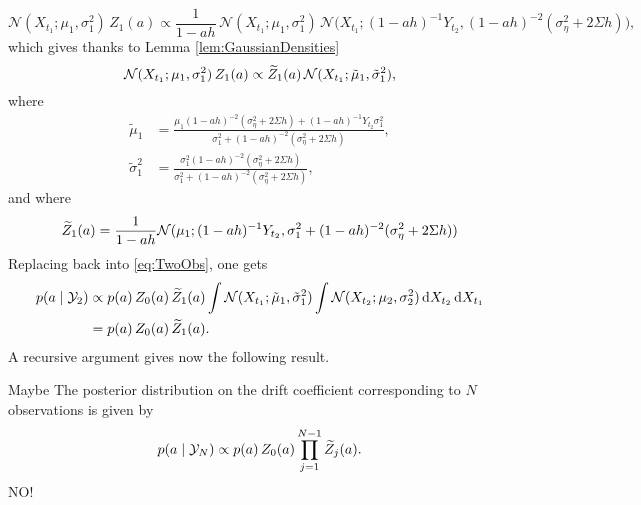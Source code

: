 \documentclass[10pt]{article}
\begin{document}
\begin{equation}
	\mathcal N(X_{t_1}; \mu_1, \sigma_1^2) \, Z_1(a) \propto \frac{1}{1 - ah} \, \mathcal N(X_{t_1}; \mu_1, \sigma_1^2) \, \mathcal N\big(X_{t_1}; (1-ah)^{-1} Y_{t_2}, (1-ah)^{-2} (\sigma_\eta^2 + 2\Sigma h)\big),
\end{equation}
which gives thanks to Lemma \ref{lem:GaussianDensities}
\begin{equation}
	\mathcal N(X_{t_1}; \mu_1, \sigma_1^2) \, Z_1(a) \propto \widetilde Z_1(a) \, \mathcal N (X_{t_1}; \tilde \mu_1, \tilde \sigma_1^2),
\end{equation}
where 
\begin{equation}
\begin{aligned}
	\tilde \mu_1 &= \frac{\mu_1 (1-ah)^{-2} (\sigma_\eta^2 + 2\Sigma h) + (1-ah)^{-1} Y_{t_2} \sigma_1^2}{\sigma_1^2 + (1-ah)^{-2} (\sigma_\eta^2 + 2\Sigma h)},\\
	\tilde \sigma_1^2 &= \frac{\sigma_1^2(1-ah)^{-2} (\sigma_\eta^2 + 2\Sigma h)}{\sigma_1^2 + (1-ah)^{-2} (\sigma_\eta^2 + 2\Sigma h)},
\end{aligned}
\end{equation}
and where
\begin{equation}
	\widetilde Z_1(a) =  \frac{1}{1-ah} \mathcal N(\mu_1; (1-ah)^{-1} Y_{t_2}, \sigma_1^2 + (1-ah)^{-2} (\sigma_\eta^2 + 2\Sigma h))\\
\end{equation}
Replacing back into \eqref{eq:TwoObs}, one gets
\begin{equation}
\begin{aligned}
	p(a \mid \mathcal Y_2) &\propto p(a) \, Z_0(a) \, \widetilde Z_1(a) \int \mathcal N(X_{t_1}; \tilde \mu_1, \tilde \sigma_1^2)  \int \mathcal N(X_{t_2}; \mu_2, \sigma_2^2) \, \mathrm{d} X_{t_2} \, \mathrm{d} X_{t_1}\\
	&= p(a) \, Z_0(a) \, \widetilde Z_1(a).
\end{aligned}
\end{equation}
A recursive argument gives now the following result.
\begin{theorem} {\color{red} Maybe} The posterior distribution on the drift coefficient corresponding to $N$ observations is given by
	\begin{equation}
		p(a \mid \mathcal Y_N) \propto p(a) \, Z_0(a) \prod_{j=1}^{N-1} \widetilde Z_j(a). 
	\end{equation}
	{\color{red} NO!}
\end{theorem}
\end{document}
